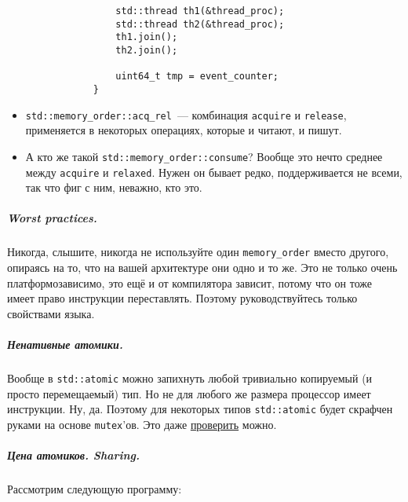 \documentclass{article}
\begin{document}
\begin{itemize}
\begin{verbatim}
                std::thread th1(&thread_proc);
                std::thread th2(&thread_proc);
                th1.join();
                th2.join();
                
                uint64_t tmp = event_counter;
            }
        \end{verbatim}
        \item \texttt{std::memory_order::acq_rel}~--- комбинация \texttt{acquire} и \texttt{release}, применяется в некоторых операциях, которые и читают, и пишут.
        \item А кто же такой \texttt{std::memory_order::consume}? Вообще это нечто среднее между \texttt{acquire} и \texttt{relaxed}. Нужен он бывает редко, поддерживается не всеми, так что фиг с ним, неважно, кто это.
    \end{itemize}
    \subparagraph{Worst practices.}
    Никогда, слышите, никогда не используйте один \texttt{memory_order} вместо другого, опираясь на то, что на вашей архитектуре они одно и то же. Это не только очень платформозависимо, это ещё и от компилятора зависит, потому что он тоже имеет право инструкции переставлять. Поэтому руководствуйтесь только свойствами языка.
    \subparagraph{Ненативные атомики.}
    Вообще в \texttt{std::atomic} можно запихнуть любой тривиально копируемый (и просто перемещаемый) тип. Но не для любого же размера процессор имеет инструкции. Ну, да. Поэтому для некоторых типов \texttt{std::atomic} будет скрафчен руками на основе \Verb|mutex|'ов. Это даже \href{https://en.cppreference.com/w/cpp/atomic/atomic/is_always_lock_free}{проверить} можно.
    \subparagraph{Цена атомиков. Sharing.}
    Рассмотрим следующую программу:
\end{document}
